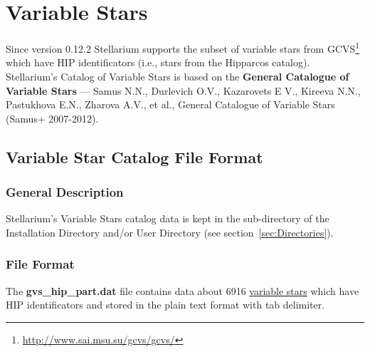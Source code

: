 \section{Variable Stars}
\label{sec:StarCatalogues:VariableStars}

Since version 0.12.2 Stellarium supports the subset of variable stars
from GCVS\footnote{\url{http://www.sai.msu.su/gcvs/gcvs/}} which have  HIP
identificators (i.e., stars from the Hipparcos catalog). Stellarium's Catalog
of Variable Stars is based on the
\textbf{General Catalogue of Variable Stars} --- Samus N.N., Durlevich
O.V., Kazarovets E V., Kireeva N.N., Pastukhova E.N., Zharova A.V., et
al., General Catalogue of Variable Stars (Samus+ 2007-2012).

\subsection{Variable Star Catalog File Format}
\label{sec:StarCatalogues:VariableStars:format}

\subsubsection{General Description}%
\label{sec:StarCatalogues:VariableStars:general}

Stellarium's Variable Stars catalog data is kept
in the  sub-directory of the Installation Directory and/or
User Directory (see section~\ref{sec:Directories}).


\subsubsection{File Format}%
\label{sec:StarCatalogues:VariableStars:file}

The \textbf{gvs\_hip\_part.dat} file contains data about 6916
\href{Variable_Stars}{variable stars} which have HIP identificators and
stored in the plain text format with tab delimiter.

